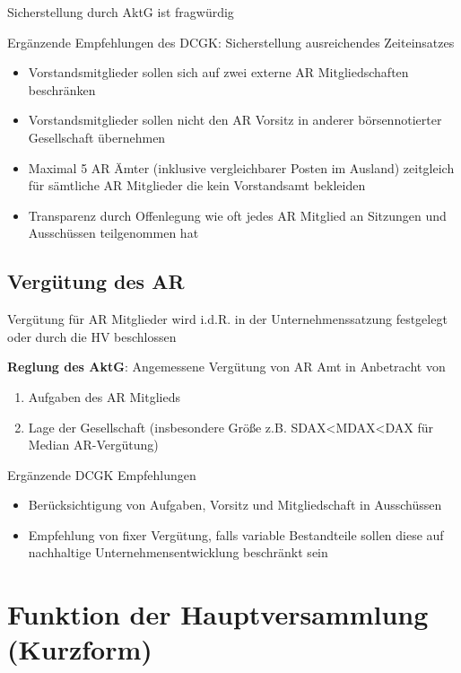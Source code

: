 \documentclass[
]{article}
\providecommand{\tightlist}{%
  \setlength{\itemsep}{0pt}\setlength{\parskip}{0pt}}
\begin{document}
Sicherstellung durch AktG ist fragwürdig

Ergänzende Empfehlungen des DCGK: Sicherstellung ausreichendes
Zeiteinsatzes

\begin{itemize}
\tightlist
\item
  Vorstandsmitglieder sollen sich auf zwei externe AR Mitgliedschaften
  beschränken
\item
  Vorstandsmitglieder sollen nicht den AR Vorsitz in anderer
  börsennotierter Gesellschaft übernehmen
\item
  Maximal 5 AR Ämter (inklusive vergleichbarer Posten im Ausland)
  zeitgleich für sämtliche AR Mitglieder die kein Vorstandsamt bekleiden
\item
  Transparenz durch Offenlegung wie oft jedes AR Mitglied an Sitzungen
  und Ausschüssen teilgenommen hat
\end{itemize}

\hypertarget{verguxfctung-des-ar}{%
\subsection{Vergütung des AR}\label{verguxfctung-des-ar}}

Vergütung für AR Mitglieder wird i.d.R. in der Unternehmenssatzung
festgelegt oder durch die HV beschlossen

\textbf{Reglung des AktG}: Angemessene Vergütung von AR Amt in
Anbetracht von

\begin{enumerate}
\def\labelenumi{\arabic{enumi}.}
\tightlist
\item
  Aufgaben des AR Mitglieds
\item
  Lage der Gesellschaft (insbesondere Größe z.B.
  SDAX\textless MDAX\textless DAX für Median AR-Vergütung)
\end{enumerate}

Ergänzende DCGK Empfehlungen

\begin{itemize}
\tightlist
\item
  Berücksichtigung von Aufgaben, Vorsitz und Mitgliedschaft in
  Ausschüssen
\item
  Empfehlung von fixer Vergütung, falls variable Bestandteile sollen
  diese auf nachhaltige Unternehmensentwicklung beschränkt sein
\end{itemize}

\hypertarget{funktion-der-hauptversammlung-kurzform}{%
\section{Funktion der Hauptversammlung
(Kurzform)}\label{funktion-der-hauptversammlung-kurzform}}
\end{document}
